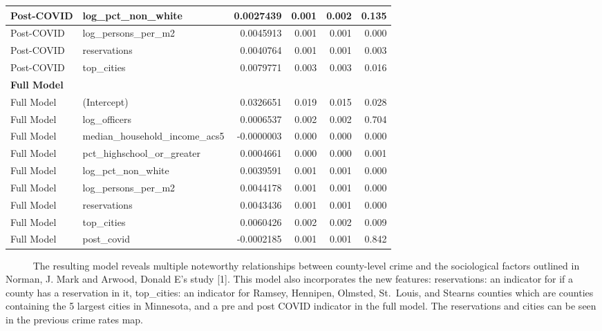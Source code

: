 \documentclass[
  11pt,
  letterpaper,
  DIV=11,
  numbers=noendperiod]{scrartcl}
\begin{document}
\begin{table}
\begin{tabular}[t]{l|l|r|r|r|r}
\hline
\hspace{1em}Post-COVID & log\_pct\_non\_white & 0.0027439 & 0.001 & 0.002 & 0.135\\
\hline
\hspace{1em}Post-COVID & log\_persons\_per\_m2 & 0.0045913 & 0.001 & 0.001 & 0.000\\
\hline
\hspace{1em}Post-COVID & reservations & 0.0040764 & 0.001 & 0.001 & 0.003\\
\hline
\hspace{1em}Post-COVID & top\_cities & 0.0079771 & 0.003 & 0.003 & 0.016\\
\hline
\multicolumn{6}{l}{\textbf{Full Model}}\\
\hline
\hspace{1em}Full Model & (Intercept) & 0.0326651 & 0.019 & 0.015 & 0.028\\
\hline
\hspace{1em}Full Model & log\_officers & 0.0006537 & 0.002 & 0.002 & 0.704\\
\hline
\hspace{1em}Full Model & median\_household\_income\_acs5 & -0.0000003 & 0.000 & 0.000 & 0.000\\
\hline
\hspace{1em}Full Model & pct\_highschool\_or\_greater & 0.0004661 & 0.000 & 0.000 & 0.001\\
\hline
\hspace{1em}Full Model & log\_pct\_non\_white & 0.0039591 & 0.001 & 0.001 & 0.000\\
\hline
\hspace{1em}Full Model & log\_persons\_per\_m2 & 0.0044178 & 0.001 & 0.001 & 0.000\\
\hline
\hspace{1em}Full Model & reservations & 0.0043436 & 0.001 & 0.001 & 0.000\\
\hline
\hspace{1em}Full Model & top\_cities & 0.0060426 & 0.002 & 0.002 & 0.009\\
\hline
\hspace{1em}Full Model & post\_covid & -0.0002185 & 0.001 & 0.001 & 0.842\\
\hline
\end{tabular}
\end{table}

~~~~~ The resulting model reveals multiple noteworthy relationships
between county-level crime and the sociological factors outlined in
Norman, J. Mark and Arwood, Donald E's study {[}1{]}. This model also
incorporates the new features: reservations: an indicator for if a
county has a reservation in it, top\_cities: an indicator for Ramsey,
Hennipen, Olmsted, St.~Louis, and Stearns counties which are counties
containing the 5 largest cities in Minnesota, and a pre and post COVID
indicator in the full model. The reservations and cities can be seen in
the previous crime rates map.
\end{document}

